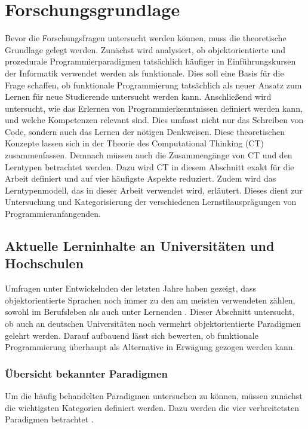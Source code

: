 \clearpage
\section{Forschungsgrundlage}
\label{sec:research}

Bevor die Forschungsfragen untersucht werden können, muss die theoretische Grundlage gelegt werden.
Zunächst wird analysiert, ob objektorientierte und prozedurale Programmierparadigmen tatsächlich häufiger in Einführungskursen der Informatik verwendet werden als funktionale. Dies soll eine Basis für die Frage schaffen, ob funktionale Programmierung tatsächlich als neuer Ansatz zum Lernen für neue Studierende untersucht werden kann.
Anschließend wird untersucht, wie das Erlernen von Programmierkenntnissen definiert werden kann, und welche Kompetenzen relevant sind. Dies umfasst nicht nur das Schreiben von Code, sondern auch das Lernen der nötigen Denkweisen. Diese theoretischen Konzepte lassen sich in der Theorie des Computational Thinking (CT) zusammenfassen. Demnach müssen auch die Zusammengänge von CT und den Lerntypen betrachtet werden.
Dazu wird CT in diesem Abschnitt exakt für die Arbeit definiert und auf vier häufigste Aspekte reduziert. Zudem wird das Lerntypenmodell, das in dieser Arbeit verwendet wird, erläutert. Dieses dient zur Untersuchung und Kategorisierung der verschiedenen Lernstilausprägungen von Programmieranfangenden.

\subsection{Aktuelle Lerninhalte an Universitäten und Hochschulen}
Umfragen unter Entwickelnden der letzten Jahre haben gezeigt, dass objektorientierte Sprachen noch immer zu den am meisten verwendeten zählen, sowohl im Berufsleben als auch unter Lernenden \cite{stackoverflow}. Dieser Abschnitt untersucht, ob auch an deutschen Universitäten noch vermehrt objektorientierte Paradigmen gelehrt werden.
Darauf aufbauend lässt sich bewerten, ob funktionale Programmierung überhaupt als Alternative in Erwägung gezogen werden kann.

\subsubsection{Übersicht bekannter Paradigmen}
Um die häufig behandelten Paradigmen untersuchen zu können, müssen zunächst die wichtigsten Kategorien definiert werden. Dazu werden die vier verbreitetsten Paradigmen betrachtet \cite{normak}.

